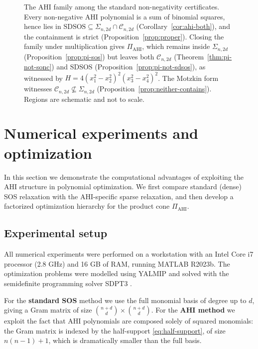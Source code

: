 \documentclass[12pt]{elsarticle}
\theoremstyle{definition}
\newcommand{\AHI}{\mathrm{AHI}}
\newcommand{\PiAHI}{\Pi_{\AHI}}
\begin{document}
\begin{figure}[htbp]
\caption{The AHI family among the standard non-negativity certificates.
Every non-negative AHI polynomial is a sum of binomial squares, hence lies in
$\mathrm{SDSOS}\subseteq\Sigma_{n,2d}\cap\mathcal{C}_{n,2d}$
(Corollary~\ref{cor:ahi-both}), and the containment is strict
(Proposition~\ref{prop:proper}). Closing the family under multiplication gives
$\Pi_{\mathrm{AHI}}$, which remains inside $\Sigma_{n,2d}$
(Proposition~\ref{prop:pi-sos}) but leaves both $\mathcal{C}_{n,2d}$
(Theorem~\ref{thm:pi-not-sonc}) and $\mathrm{SDSOS}$
(Proposition~\ref{prop:pi-not-sdsos}), as witnessed by
$H=4(x_1^2-x_2^2)^2(x_3^2-x_4^2)^2$. The Motzkin form witnesses
$\mathcal{C}_{n,2d}\not\subseteq\Sigma_{n,2d}$
(Proposition~\ref{prop:neither-contains}). Regions are schematic and not to scale.}
\label{fig:cone-hierarchy}
\end{figure}
\section{Numerical experiments and optimization}\label{sec:numerics}

In this section we demonstrate the computational advantages of exploiting the AHI structure in polynomial optimization. We first compare standard (dense) SOS relaxation with the AHI-specific sparse relaxation, and then develop a factorized optimization hierarchy for the product cone $\PiAHI$.

\subsection{Experimental setup}\label{subsec:setup}
All numerical experiments were performed on a workstation with an Intel Core i7 processor (2.8 GHz) and 16 GB of RAM, running MATLAB R2023b. The optimization problems were modelled using YALMIP \cite{lofberg2004yalmip} and solved with the semidefinite programming solver SDPT3 \cite{toh1999sdpt3}.

For the \textbf{standard SOS} method we use the full monomial basis of degree up to $d$, giving a Gram matrix of size $\binom{n+d}{d} \times \binom{n+d}{d}$. For the \textbf{AHI method} we exploit the fact that AHI polynomials are composed solely of squared monomials: the Gram matrix is indexed by the half-support \eqref{eq:half-support}, of size $n(n-1)+1$, which is dramatically smaller than the full basis.
\end{document}
